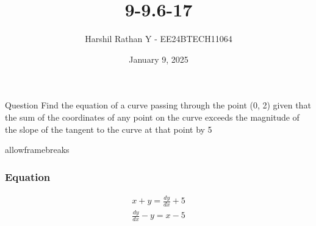 \documentclass{beamer}
\title %
{9-9.6-17}
\date{January 9, 2025}
\author %
{Harshil Rathan Y - EE24BTECH11064}
\begin{document}
\frame{\titlepage}
\begin{frame}{Question}
Find the equation of a curve passing through the point (0, 2) given that the sum of the coordinates of any point on the curve exceeds the magnitude of the slope of the tangent to the curve at that point by 5
\end{frame}
\begin{frame}{allowframebreaks}
\frametitle{Equation}

    \centering
    
    \label{tab:parameters}
    \begin{align}
         x+y = \frac{dy}{dx} + 5
    \end{align}
    \begin{align}
        \frac{dy}{dx} - y= x-5
    \label{0.2}
    \end{align}
   
\end{frame}
\end{document}
